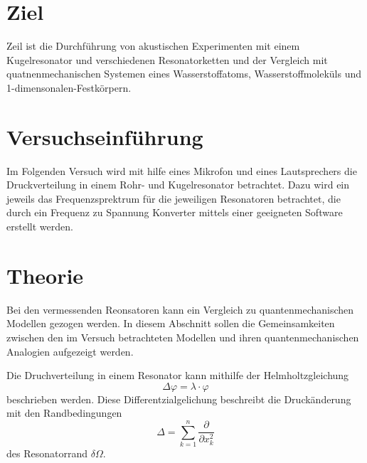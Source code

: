 \section{Ziel}
Zeil ist die Durchführung von akustischen Experimenten mit einem Kugelresonator und verschiedenen Resonatorketten
und der Vergleich mit quatnenmechanischen Systemen eines Wasserstoffatoms, Wasserstoffmoleküls und 1-dimensonalen-Festkörpern.

\section{Versuchseinführung}
Im Folgenden Versuch wird mit hilfe eines Mikrofon und eines Lautsprechers die Druckverteilung in einem Rohr- und Kugelresonator 
betrachtet. Dazu wird ein jeweils das Frequenzsprektrum für die jeweiligen Resonatoren betrachtet, die durch ein Frequenz zu Spannung Konverter
mittels einer geeigneten Software erstellt werden. 

\section{Theorie}
Bei den vermessenden Reonsatoren kann ein Vergleich zu quantenmechanischen Modellen gezogen werden. In diesem 
Abschnitt sollen die Gemeinsamkeiten zwischen den im Versuch betrachteten Modellen und ihren
quantenmechanischen Analogien aufgezeigt werden.

Die Druchverteilung in einem Resonator kann mithilfe der Helmholtzgleichung
\begin{equation}
    \Delta \varphi=\lambda \cdot \varphi
    \label{eq:helmholtz_all}
\end{equation}
beschrieben werden. Diese Differentzialgelichung beschreibt die Druckänderung mit den Randbedingungen
\begin{equation}
    \Delta=\sum_{k=1}^n \frac{\partial}{\partial x_k^2}
\end{equation}
des Resonatorrand $\delta \Omega$.




